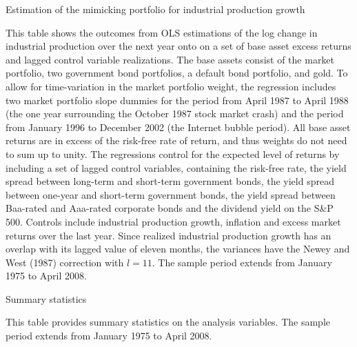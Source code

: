 \documentclass[12pt,a4paper]{ouparticle}
\begin{document}
\begin{table}
  \begin{threeparttable}
    \caption{Estimation of the mimicking portfolio for industrial production growth}
    
    \begin{tablenotes} 
    \footnotesize
    \item This table shows the outcomes from OLS estimations of the log change in industrial production over the next year onto on a set of base asset excess returns and lagged control variable realizations. The base assets consist of the market portfolio, two government bond portfolios, a default bond portfolio, and gold. To allow for time-variation in the market portfolio weight, the regression includes two market portfolio slope dummies for the period from April 1987 to April 1988 (the one year surrounding the October 1987 stock market crash) and the period from January 1996 to December 2002 (the Internet bubble period). All base asset returns are in excess of the risk-free rate of return, and thus weights do not need to sum up to unity. The regressions control for the expected level of returns by including a set of lagged control variables, containing the risk-free rate, the yield spread between long-term and short-term government bonds, the yield spread between one-year and short-term government bonds, the yield spread between Baa-rated and Aaa-rated corporate bonds and the dividend yield on the S\&P 500. Controls include industrial production growth, inflation and excess market returns over the last year. Since realized industrial production growth has an overlap with its lagged value of eleven months, the variances have the Newey and West (1987) correction with $l = 11$. The sample period extends from January 1975 to April 2008.
    \end{tablenotes}
  \end{threeparttable}
\end{table}

\begin{table}
\centering
  \begin{threeparttable}
    \caption{Summary statistics}
    
    \begin{tablenotes} 
    \small 
    \item This table provides summary statistics on the analysis variables. The sample period extends from January 1975 to April 2008.
    \end{tablenotes}
  \end{threeparttable}
\end{table}
\end{document}
